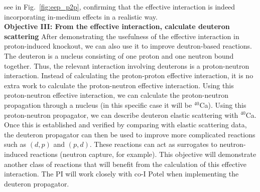 \documentclass[12pt]{article}
\begin{document}
see in Fig.~\ref{fig:eep_p2p}, confirming that the effective interaction is indeed incorporating in-medium effects in a realistic way. 
\\
\textbf{Objective III: From the effective interaction, calculate deuteron scattering}
After demonstrating the usefulness of the effective interaction in proton-induced knockout, we can also use it to improve deutron-based reactions. The deuteron is a nucleus
consisting of one proton and one neutron bound together. Thus, the relevant interaction involving deuterons is a proton-neutron interaction. Instead of calculating the
proton-proton effective interaction, it is no extra work to calculate the proton-neutron effective interaction. Using this proton-neutron effective interaction, we can calculate
the proton-neutron propagation through a nucleus (in this specific case it will be $^{40}$Ca). Using this proton-neutron propagator, we can describe deuteron elastic scattering
with $^{40}$Ca. Once this is established and verified by comparing with elastic scattering data, the deuteron propagator can then be used to improve more complicated reactions such
as $(d,p)$ and $(p,d)$. These reactions can act as surrogates to neutron-induced reactions (neutron capture, for example). This objective will demonstrate another class of
reactions that will benefit from the calculation of this effective interaction. The PI will work closely with co-I Potel when implementing the deuteron propagator.
\\
\end{document}
